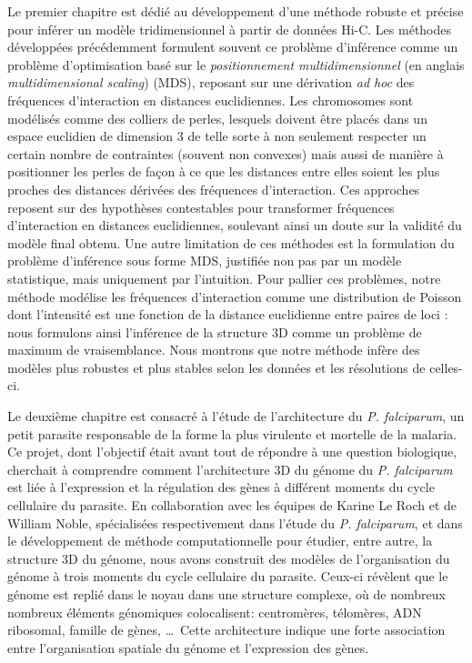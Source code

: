 \begin{resumes}
Le premier chapitre est dédié au développement d'une méthode robuste et
précise pour inférer un modèle tridimensionnel à partir de données Hi-C.
Les méthodes développées précédemment formulent souvent ce problème
d'inférence comme un problème d'optimisation basé sur le {\em positionnement
multidimensionnel} (en anglais {\em multidimensional scaling}) (MDS), reposant
sur une dérivation {\em ad hoc} des fréquences d'interaction en distances
euclidiennes. Les chromosomes sont modélisés comme des colliers de perles,
lesquels doivent être placés dans un espace euclidien de dimension 3 de telle
sorte à non seulement respecter un certain nombre de contraintes (souvent non
convexes) mais aussi de manière à positionner les perles de façon à ce que les
distances entre elles soient les plus proches des distances dérivées des
fréquences d'interaction. Ces approches reposent sur des hypothèses
contestables pour transformer fréquences d'interaction en distances
euclidiennes, soulevant ainsi un doute sur la validité du modèle final obtenu.
Une autre limitation de ces méthodes est la formulation du problème
d'inférence sous forme MDS, justifiée non pas par un modèle statistique, mais
uniquement par l'intuition. Pour pallier ces problèmes, notre méthode
modélise les fréquences d'interaction comme une distribution de Poisson dont
l'intensité est une fonction de la distance euclidienne entre paires de loci :
nous formulons ainsi l'inférence de la structure 3D comme un problème de
maximum de vraisemblance. Nous montrons que notre méthode infère des modèles
plus robustes et plus stables selon les données et les résolutions de
celles-ci.

Le deuxième chapitre est consacré à l'étude de l'architecture du {\em P.
falciparum}, un petit parasite responsable de la forme la plus virulente et
mortelle de la malaria. Ce projet, dont l'objectif était avant tout de répondre à une
question biologique, cherchait à comprendre comment l'architecture 3D du
génome du {\em P. falciparum} est liée à l'expression et la régulation des
gènes à différent moments du cycle cellulaire du parasite. En collaboration
avec les équipes de Karine Le Roch et de William Noble, spécialisées
respectivement dans l'étude du {\em P. falciparum}, et dans le développement
de méthode computationnelle pour étudier, entre autre, la structure 3D du
génome, nous avons construit des modèles de l'organisation du génome à trois
moments du cycle cellulaire du parasite. Ceux-ci révèlent que le génome est
replié dans le noyau dans une structure complexe, où de nombreux 
nombreux éléments génomiques colocalisent: centromères, télomères, ADN
ribosomal, famille
de gènes, \dots \ Cette architecture indique une forte association entre
l'organisation spatiale du génome et l'expression des gènes.


\end{resumes}
